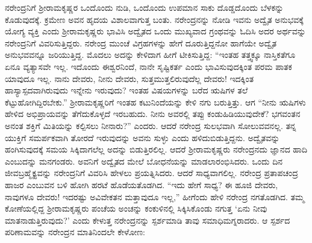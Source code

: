 ನರೇಂದ್ರನಿಗೆ ಶ‍್ರೀರಾಮಕೃಷ್ಣರ ಒಂದೊಂದು ನುಡಿ, ಒಂದೊಂದು ಉಪಮಾನ ಸಾಕು ದೊಡ್ಡದೊಂದು ಬೆಳಕನ್ನು ಕೊಡುವುದಕ್ಕೆ. ಕ್ರಮೇಣ ಅವನ ಹೃದಯ ವಿಶಾಲವಾಗುತ್ತ ಬಂತು. ನರೇಂದ್ರನನ್ನು ನೋಡಿ ಇವನು ಅದ್ವೈತ ಅನುಭವಕ್ಕೆ ಯೋಗ್ಯ ವ್ಯಕ್ತಿ ಎಂದು ಶ‍್ರೀರಾಮಕೃಷ್ಣರು ಭಾವಿಸಿ ಅದ್ವೈತದ ಒಂದು ಮುಖ್ಯವಾದ ಗ್ರಂಥವನ್ನು ಓದಿಸಿ ಅದರ ಅರ್ಥವನ್ನು ನರೇಂದ್ರನಿಗೆ ವಿವರಿಸುತ್ತಿದ್ದರು. ನರೇಂದ್ರ ಮುಂಚೆ ವಿಗ್ರಹಗಳನ್ನು ಹೇಗೆ ದೂರುತ್ತಿದ್ದನೋ ಹಾಗೆಯೇ ಅದ್ವೈತ ಅನುಭವವನ್ನೂ ಜರಿಯುತ್ತಿದ್ದ. ಮೊದಲು ಅದನ್ನು ಕೇಳಿದಾಗ ಹೀಗೆ ಟೀಕಿಸುತ್ತಿದ್ದ: “ಇಂತಹ ತತ್ತ್ವಕ್ಕೂ ನಾಸ್ತಿಕತೆಗೂ ಏನೂ ವ್ಯತ್ಯಾಸವೇ ಇಲ್ಲ. ಇದೊಂದು ಈಶ್ವರನಿಂದೆ, ನಾನೇ ಸೃಷ್ಟಿಕರ್ತ ಎಂದು ಭಾವಿಸುವುದಕ್ಕಿಂತ ಪರಮ ಪಾತಕ ಯಾವುದೂ ಇಲ್ಲ. ನಾನು ದೇವರು, ನೀನು ದೇವರು, ಸುತ್ತಮುತ್ತಲಿರುವುದೆಲ್ಲ ದೇವರು! ಇದಕ್ಕಿಂತ ಹಾಸ್ಯಾಸ್ಪದವಾಗಿರುವುದು ಇನ್ನೇನು ಇರುವುದು? ಇಂತಹ ವಿಷಯಗಳನ್ನು ಬರೆದ ಋಷಿಗಳ ತಲೆ ಕೆಟ್ಟುಹೋಗಿದ್ದಿರಬೇಕು.” ಶ‍್ರೀರಾಮಕೃಷ್ಣರಿಗೆ ಇಂತಹ ಕಟುನಿಂದೆಯನ್ನು ಕೇಳಿ ನಗು ಬರುತ್ತಿತ್ತು. ಆಗ “ನೀನು ಋಷಿಗಳು ಹೇಳಿದ ಅಭಿಪ್ರಾಯವನ್ನು ತೆಗೆದುಕೊಳ್ಳದೆ ಇರಬಹುದು. ನೀನು ಅವರಲ್ಲಿ ತಪ್ಪು ಕಂಡುಹಿಡಿಯುವುದೇಕೆ? ಭಗವಂತನ ಅನಂತ ಶಕ್ತಿಗೆ ಮಿತಿಯನ್ನು ಕಲ್ಪಿಸಲು ನೀನಾರು?” ಎಂದರು. ಆದರೆ ನರೇಂದ್ರ ಸುಲಭವಾಗಿ ಸೋಲುವವನಲ್ಲ. ತನ್ನ ಯುಕ್ತಿಗೆ ಸಮರ್ಪಕವಾಗಿ ತೋರದೆ ಇರುವುದನ್ನು ಅವನು ಸುಳ್ಳು ಎಂದು ಹಳಿದುಬಿಡುತ್ತಿದ್ದನು. ಅದ್ವೈತವನ್ನು ಹಂಗಿಸುವುದಕ್ಕೆ ಸಮಯ ಸಿಕ್ಕಿದಾಗಲೆಲ್ಲ ಅದನ್ನು ಬಿಡುತ್ತಿರಲಿಲ್ಲ. ಆದರೆ ಶ‍್ರೀರಾಮಕೃಷ್ಣರು ನರೇಂದ್ರನದು ಜ್ಞಾನದ ಹಾದಿ ಎಂಬುದನ್ನು ಮನಗಂಡರು. ಅವನಿಗೆ ಅದ್ವೈತದ ಮೇಲೆ ಬೋಧನೆಯನ್ನು ಮಾಡಲಾರಂಭಿಸಿದರು. ಒಂದು ದಿನ ಜೀವಬ್ರಹ್ಮೈಕ್ಯವನ್ನು ನರೇಂದ್ರನಿಗೆ ವಿವರಿಸಿ ಹೇಳಲು ಪ್ರಯತ್ನಿಸಿದರು. ಆದರೆ ಸಾಧ್ಯವಾಗಲಿಲ್ಲ. ನರೇಂದ್ರ ಪ್ರತಾಪಚಂದ್ರ ಹಾಜರ ಎಂಬುವನ ಬಳಿ ಹೋಗಿ ಹರಟೆ ಹೊಡೆಯತೊಡಗಿದ. “ಇದು ಹೇಗೆ ಸಾಧ್ಯ? ಈ ಹೂಜಿ ದೇವರು, ನಾವುಗಳೂ ದೇವರು! ಇದರಷ್ಟು ಅವಿವೇಕತನ ಮತ್ತಾವುದೂ ಇಲ್ಲ,” ಹೀಗೆಂದು ಹೇಳಿ ನರೇಂದ್ರ ನಗತೊಡಗಿದ. ತಮ್ಮ ಕೋಣೆಯಲ್ಲಿದ್ದ ಶ‍್ರೀರಾಮಕೃಷ್ಣರು ಪಂಚೆಯ ಅಂಚನ್ನು ಕಂಕುಳಿನಲ್ಲಿ ಸಿಕ್ಕಿಸಿಕೊಂಡು ನಗುತ್ತ ‘ಏನು ನೀವು ಮಾತನಾಡುತ್ತಿರುವುದು?’ ಎಂದು ಕೇಳುತ್ತ ನರೇಂದ್ರನನ್ನು ಸ್ಪರ್ಶಮಾಡಿ ತಾವು ಸಮಾಧಿಮಗ್ನರಾದರು. ಆ ಸ್ಪರ್ಶದ ಪರಿಣಾಮವನ್ನು ನರೇಂದ್ರನ ಮಾತಿನಿಂದಲೇ ಕೇಳೋಣ:

